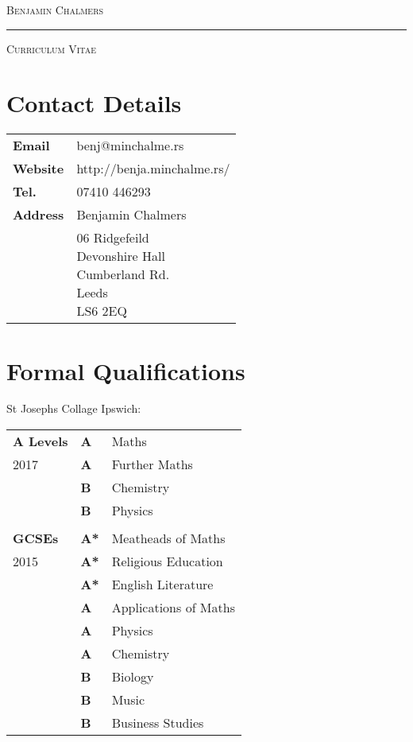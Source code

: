 \documentclass[9pt,a4paper]{article}
\begin{document}
\begin{center}

  \textsc{\Huge{Benjamin Chalmers}}
  \vspace{0.3cm}

  \noindent\rule{0.8\textwidth}{0.4pt}
  \vspace{0.3cm}

  \textsc{\large{Curriculum Vitae}}
  \vspace{0.2cm}

\end{center}
\begin{multicols*}{2}
  \section*{Contact Details} 
\begin{center}
  \begin{tabular}{p{2cm}p{6cm}}
    \textbf{Email}&benj@minchalme.rs\\
    \textbf{Website}&http://benja.minchalme.rs/\\
    \textbf{Tel.}&07410 446293\\
    \textbf{Address}&Benjamin Chalmers\\
    &\parbox{5cm}{06 Ridgefeild\\Devonshire Hall\\Cumberland Rd.\\Leeds\\LS6 2EQ}\\
  \end{tabular}
\end{center}

  \section*{Formal Qualifications}
  St Josephs Collage Ipswich:
\begin{center}
  \begin{tabular}{p{2cm} p{0.6cm} p{5.4cm}}
    \textbf{A Levels}&\textbf{A}&Maths\\
	2017&\textbf{A}&Further Maths\\
	    &\textbf{B}&Chemistry\\
	    &\textbf{B}&Physics\\
\\
    \textbf{GCSEs}&\textbf{A*}&Meatheads of Maths\\
	2015&\textbf{A*}&Religious Education\\
	    &\textbf{A*}&English Literature\\
 	    &\textbf{A}&Applications of Maths\\
	    &\textbf{A}&Physics\\
	    &\textbf{A}&Chemistry\\
	    &\textbf{B}&Biology\\
	    &\textbf{B}&Music\\
	    &\textbf{B}&Business Studies\\
  \end{tabular}
\end{center}


\end{multicols*}
\end{document}
